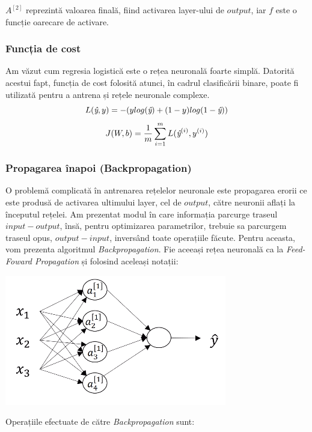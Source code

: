 $A^{[2]}$ reprezintă valoarea finală, fiind activarea layer-ului de $output$, iar $f$ este o funcție oarecare de activare. \cite{deeplearningAI}

\subsubsection{Funcția de cost}
Am văzut cum regresia logistică este o rețea neuronală foarte simplă. Datorită acestui fapt, funcția de cost folosită atunci, în cadrul clasificării binare, poate fi utilizată pentru a antrena și rețele neuronale complexe.
$$L(\textit{\^{y}}, y)=-(ylog(\textit{\^{y}}) + (1-y)log(1 - \textit{\^{y}}))$$
$$\displaystyle{J(W,b)=\frac{1}{m}\sum\limits_{i=1}^{m}L(\textit{\^{y}}^{(i)}, y^{(i)})}$$ 

\subsubsection{Propagarea înapoi (Backpropagation)}
O problemă complicată în antrenarea rețelelor neuronale este propagarea erorii ce este produsă de activarea ultimului layer, cel de $output$, către neuronii aflați la începutul rețelei. Am prezentat modul în care informația parcurge traseul $input-output$, însă, pentru optimizarea parametrilor, trebuie sa parcurgem traseul opus, $output-input$, inversând toate operațiile făcute. Pentru aceasta, vom prezenta algoritmul \textit{Backpropagation}. Fie aceeași rețea neuronală ca la \textit{Feed-Foward Propagation} și folosind aceleași notații:

\begin{center}
\includegraphics[scale=1]{feedFoward}
\end{center}

Operațiile efectuate de către \textit{Backpropagation} sunt:

